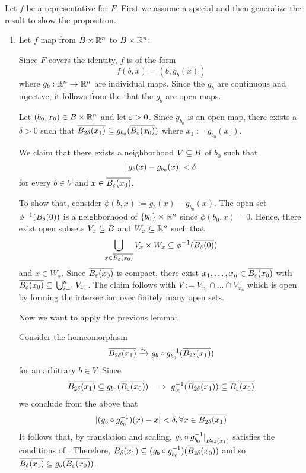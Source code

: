 \begin{myproof}
    Let $f$ be a representative for $F$.
    First we assume a special and then generalize the result to show the proposition.
    \begin{enumerate}
        \item Let $f$ map from $B \times \mathbb{R}^n$ to $B \times \mathbb{R}^n$:
        
        Since $F$ covers the identity, $f$ is of the form
        \[ f(b, x) = (b, g_b(x)) \]
        where $g_b: \mathbb{R}^n \to \mathbb{R}^n$ are individual maps.
        Since the $g_b$ are continuous and injective, it follows from the  that the $g_b$ are open maps.
        
        Let $(b_0, x_0) \in B \times \mathbb{R}^n$ and let $\varepsilon{} > 0$.
        Since $g_{b_0}$ is an open map, there exists a $\delta > 0$ such that
        $\clball[2\delta][x_1] \sub g_{b_0}(\clball[\eps][x_0])$ where $x_1 := g_{b_0}(x_0)$.

        We claim that there exists a neighborhood $V \subseteq{} B$ of $b_0$ such that
        \[ \vert{} g_b(x) - g_{b_0}(x) \vert{} < \delta \]
        for every $b \in V$ and $x \in \clball[\eps][x_0]$.
        
        To show that, consider $\phi(b, x) := g_b(x) - g_{b_0}(x)$.
        The open set $\phi^{-1}(\ball[\delta])$ is a neighborhood of $\{b_0\} \times \mathbb{R}^n$ since $\phi(b_0, x) = 0$.
        Hence, there exist open subsets $V_x \subseteq{} B$ and $W_x \subseteq{} \mathbb{R}^n$ such that
        \[ \bigcup_{x \in \clball[\eps][x_0]} V_x \times W_x \sub \inv{\phi}(\clball[\delta]) \]
        and $x \in W_x$.
        Since $\clball[\eps][x_0]$ is compact, there exist $x_1, \dots, x_n \in \clball[\eps][x_0]$ with $\clball[\eps][x_0] \sub \bigcup_{i = 1}^{n} V_{x_i}$.
        The claim follows with $V := V_{x_1} \cap \dots \cap V_{x_n}$ which is open by forming the intersection over finitely many open sets.

        Now we want to apply the previous lemma:

        Consider the homeomorphism
        \[ \clball[2\delta][x_1] \isomto g_b \circ \inv{g_{b_0}}(\clball[2\delta][x_1]) \]
        for an arbitrary $b \in V$.
        Since
        \[ \clball[2\delta][x_1] \sub g_{b_0}(\clball[\eps][x_0]) \implies g_{b_0}^{-1}(\clball[2\delta][x_1]) \sub \clball[\eps][x_0] \]
        we conclude from the above that
        \[ \abs{(g_b \circ g_{b_0}^{-1})(x) - x} < \delta, \forall x \in \clball[2\delta][x_1] \]
        It follows that, by translation and scaling, $g_b \circ g_{b_0}^{-1}\restr{\clball[2\delta][x_1]}$ satisfies the conditions of .
        Therefore, $\clball[\delta][x_1] \sub (g_b \circ g_{b_0}^{-1})(\clball[2\delta][x_0])$ and so $\clball[\delta][x_1] \sub g_b(\clball[\eps][x_0])$.


\end{enumerate}
\end{myproof}
